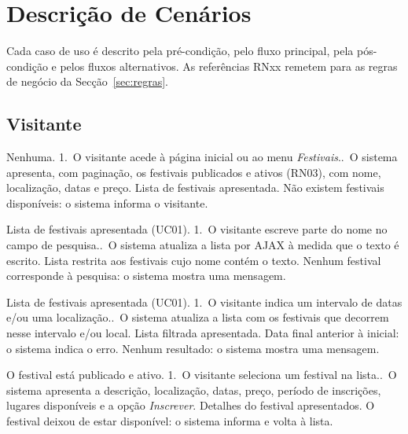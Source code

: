 \section{Descrição de Cenários}

Cada caso de uso é descrito pela pré-condição, pelo fluxo principal, pela
pós-condição e pelos fluxos alternativos. As referências RNxx remetem para as
regras de negócio da Secção~\ref{sec:regras}.

\subsection{Visitante}

{Nenhuma.}
{1.~O visitante acede à página inicial ou ao menu \emph{Festivais}..~O sistema apresenta, com paginação, os festivais publicados e ativos
 (RN03), com nome, localização, datas e preço.}
{Lista de festivais apresentada.}
{Não existem festivais disponíveis: o sistema informa o visitante.}

{Lista de festivais apresentada (UC01).}
{1.~O visitante escreve parte do nome no campo de pesquisa..~O sistema atualiza a lista por AJAX à medida que o texto é escrito.}
{Lista restrita aos festivais cujo nome contém o texto.}
{Nenhum festival corresponde à pesquisa: o sistema mostra uma mensagem.}

{Lista de festivais apresentada (UC01).}
{1.~O visitante indica um intervalo de datas e/ou uma localização..~O sistema atualiza a lista com os festivais que decorrem nesse intervalo
 e/ou local.}
{Lista filtrada apresentada.}
{Data final anterior à inicial: o sistema indica o erro.
 Nenhum resultado: o sistema mostra uma mensagem.}

{O festival está publicado e ativo.}
{1.~O visitante seleciona um festival na lista..~O sistema apresenta a descrição, localização, datas, preço, período de
 inscrições, lugares disponíveis e a opção \emph{Inscrever}.}
{Detalhes do festival apresentados.}
{O festival deixou de estar disponível: o sistema informa e volta à lista.}

